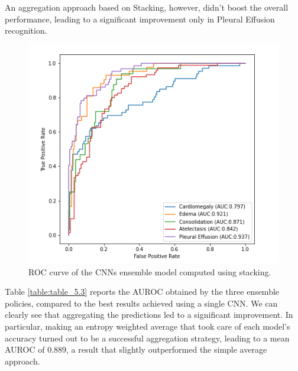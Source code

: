 \newpage

An aggregation approach based on Stacking, however, didn't boost the overall performance, leading to a significant improvement only in Pleural Effusion recognition.

\begin{figure}[htbp!]
    \centering
    \includegraphics[scale=0.55]{Tesi/images/Results/nn_stacking.png}
    \caption[ROC curve for CNN stacking ensemble]{ROC curve of the \acp{CNN} ensemble model computed using stacking.}
    \label{fig:figure_5.7}
\end{figure}

Table \ref{table:table_5.3} reports the \acs{AUROC} obtained by the three ensemble policies, compared to the best results achieved using a single \ac{CNN}. We can clearly see that aggregating the predictions led to a significant improvement. In particular, making an entropy weighted average that took care of each model's accuracy turned out to be a successful aggregation strategy, leading to a mean \ac{AUROC} of 0.889, a result that slightly outperformed the simple average approach. 


